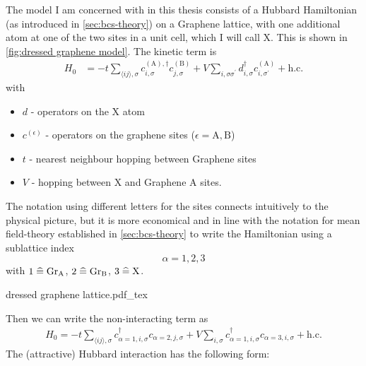\documentclass[../notes.tex]{subfiles}
\begin{document}
The model I am concerned with in this thesis consists of a Hubbard Hamiltonian (as introduced in \cref{sec:bcs-theory}) on a Graphene lattice, with one additional atom at one of the two sites in a unit cell, which I will call X\@.
This is shown in \cref{fig:dressed graphene model}.
The kinetic term is
\begin{align}
	H_0 &= -t \sum_{\langle ij \rangle, \sigma}
	c_{i, \sigma}^{(\mathrm{A}), \dagger} c_{j, \sigma}^{(\mathrm{B})}
	+ V \sum_{i, \sigma \sigma^{\prime}}
	d_{i, \sigma}^{\dagger} c_{i, \sigma^{\prime}}^{(\mathrm{A})} + \mathrm{h.c.}
	\label{eq:EG-X model Hamiltonian non-interacting}
\end{align}
with
\begin{itemize}
	\item \(d\) - operators on the X atom
	\item \(c^{(\epsilon)}\) - operators on the graphene sites (\(\epsilon = \mathrm{A}, \mathrm{B}\))
	\item \(t\) - nearest neighbour hopping between Graphene sites
	\item \(V\) - hopping between \(\mathrm{X}\) and Graphene \(\mathrm{A}\) sites.
\end{itemize}
The notation using different letters for the sites connects intuitively to the physical picture, but it is more economical and in line with the notation for mean field-theory established in \cref{sec:bcs-theory} to write the Hamiltonian using a sublattice index
\begin{equation}
	\alpha = 1, 2, 3
\end{equation}
with \(1 \mathrel{\widehat{=}} \mathrm{Gr}_{\mathrm{A}}\), \(2 \mathrel{\widehat{=}} \mathrm{Gr}_{\mathrm{B}}\), \(3 \mathrel{\widehat{=}} \mathrm{X}\).
\begin{SCfigure}[50][t]
	\centering
	{dressed graphene lattice.pdf_tex}
	\caption{\textbf{Lattice structure of decorated graphene honeycomb lattice.} with impurity X hybridized to sublattice site A. Only hopping t between sublattices A and B as well as V between X and A exist. Created using VESTA \cite{mommaVESTA3Threedimensional2011}.}
	\label{fig:dressed graphene model}
\end{SCfigure}
Then we can write the non-interacting term as
\begin{align}
	H_0 = -t \sum_{\langle ij \rangle, \sigma} c_{\alpha = 1, i, \sigma}^{\dagger} c_{\alpha = 2, j, \sigma}
	+ V \sum_{i, \sigma}
	c_{\alpha = 1, i, \sigma}^{\dagger} c_{\alpha = 3, i, \sigma} + \mathrm{h.c.}
\end{align}
The (attractive) Hubbard interaction has the following form:
\end{document}
